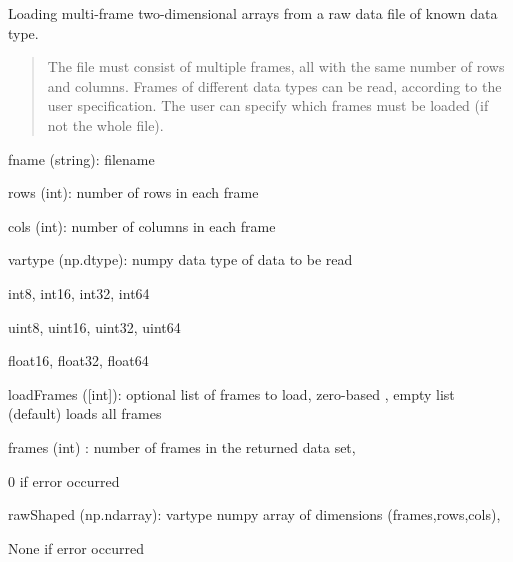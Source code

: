 \documentclass[a4paper,10pt,english]{sphinxmanual}
\begin{document}
\begin{fulllineitems}
\label{ryfiles:pyradi.ryfiles.readRawFrames}
Loading multi-frame two-dimensional arrays from a raw data file of known data type.
\begin{quote}

The file must consist of multiple frames, all with the same number of rows and columns.
Frames of different data types can be read, according to the user specification.  
The user can specify which frames must be loaded (if not the whole file).
\end{quote}
\begin{description}
\item[{Args:}] \leavevmode
\begin{DUlineblock}{0em}
\item[] fname (string): filename
\item[] rows (int): number of rows in each frame
\item[] cols (int): number of columns in each frame
\item[] vartype (np.dtype): numpy data type of data to be read
\item[]
\begin{DUlineblock}{\DUlineblockindent}
\item[] int8, int16, int32, int64
\item[] uint8, uint16, uint32, uint64
\item[] float16, float32, float64
\end{DUlineblock}
\item[] loadFrames ({[}int{]}): optional list of frames to load, zero-based , empty list (default) loads all frames
\end{DUlineblock}

\item[{Returns:}] \leavevmode
\begin{DUlineblock}{0em}
\item[] frames (int) : number of frames in the returned data set,
\item[]
\begin{DUlineblock}{\DUlineblockindent}
\item[] 0 if error occurred
\end{DUlineblock}
\item[] rawShaped (np.ndarray): vartype numpy array of dimensions (frames,rows,cols),
\item[]
\begin{DUlineblock}{\DUlineblockindent}
\item[] None if error occurred
\end{DUlineblock}
\end{DUlineblock}


\end{description}
\end{fulllineitems}
\end{document}

